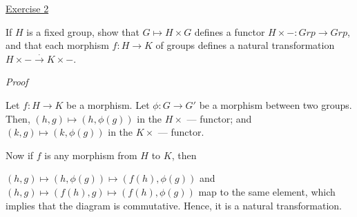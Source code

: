 \noindent
\underline{Exercise 2}
\vspace{2mm}

If $H$ is a fixed group, show that $G \mapsto H \times G$ defines a functor $H \times - : Grp \to Grp$,
and that each morphism $f : H \to K$ of groups defines a natural transformation $H \times - \xrightarrow{.} K \times -$.

\vspace{2mm}
\noindent
\emph{Proof}

Let $f : H \to K$ be a morphism. Let $\phi : G \to G'$ be a morphism between two groups. Then, $(h, g) \mapsto (h, \phi(g))$ in the $H \times$ --- functor; and $(k, g) \mapsto (k, \phi(g))$ in the $K \times$ --- functor. 

Now if $f$ is any morphism from $H$ to $K$, then 

$(h, g) \mapsto (h, \phi(g)) \mapsto (f(h), \phi(g))$ and $(h, g) \mapsto (f(h), g) \mapsto (f(h), \phi(g))$ map to the same element, which implies that the diagram is commutative. Hence, it is a natural transformation.

\vspace{2mm}
